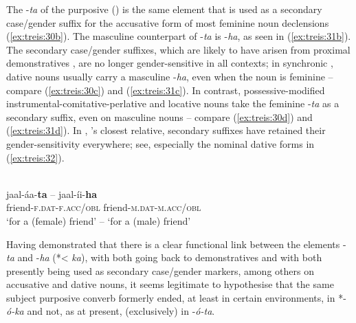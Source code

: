 \documentclass[output=paper,colorlinks,citecolor=brown,]{langscibook}
\begin{document}
The \nobreakdash-\textit{ta} of the purposive () is the same element that is used as a secondary case\slash gender suffix for the accusative form of most feminine noun declensions (\ref{ex:treis:30b}). The masculine counterpart of \nobreakdash-\textit{ta} is \nobreakdash-\textit{ha}, as seen in (\ref{ex:treis:31b}). The secondary case\slash gender suffixes, which are likely to have arisen from proximal demonstratives \citep[128--130]{Treis2008}, are no longer gender-sensitive in all contexts; in synchronic , dative nouns usually carry a masculine \nobreakdash-\textit{ha}, even when the noun is feminine -- compare (\ref{ex:treis:30c}) and (\ref{ex:treis:31c}). In contrast, possessive-modified instrumental-comitative-perlative and locative nouns take the feminine \nobreakdash-\textit{ta} as a secondary suffix, even on masculine nouns -- compare (\ref{ex:treis:30d}) and (\ref{ex:treis:31d}). In , 's closest relative, secondary suffixes have retained their gender-sensitivity everywhere; see, especially the nominal dative forms in (\ref{ex:treis:32}).

\ea\label{ex:treis:32}
\\
\gll jaal-áa-\textbf{ta} -- jaal-íi-\textbf{ha}\\
friend-\textsc{f.dat-f.acc/obl} {} friend-\textsc{m.dat-m.acc/obl}\\
\glt `for a (female) friend' -- `for a (male) friend'
\z

Having demonstrated that there is a clear functional link between the elements \nobreakdash-\textit{ta} and \nobreakdash-\textit{ha} (*< \textit{ka}), with both going back to demonstratives and with both presently being used as secondary case\slash gender markers, among others on accusative and dative nouns, it seems legitimate to hypothesise that the  same subject purposive converb formerly ended, at least in certain environments, in *-\textit{ó-ka} and not, as at present, (exclusively) in \nobreakdash-\textit{ó-ta}.
\end{document}
